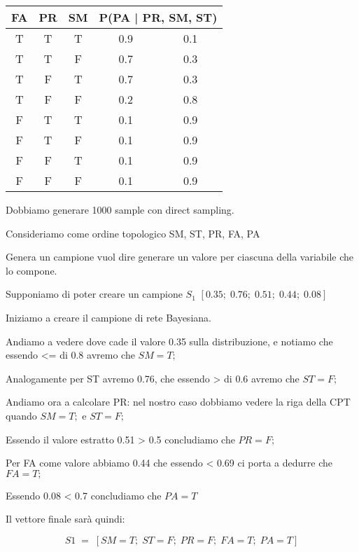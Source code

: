 \documentclass{article}
\begin{document}
\begin{tabular}{|c|c|c|cc|}
	\hline
	FA & PR & SM & \multicolumn{2}{c|}{P(PA | PR, SM, ST)} \\ \hline
	T  & T  & T  & \multicolumn{1}{c|}{0.9}      & 0.1     \\ \hline
	T  & T  & F  & \multicolumn{1}{c|}{0.7}      & 0.3     \\ \hline
	T  & F  & T  & \multicolumn{1}{c|}{0.7}      & 0.3     \\ \hline
	T  & F  & F  & \multicolumn{1}{c|}{0.2}      & 0.8     \\ \hline
	F  & T  & T  & \multicolumn{1}{c|}{0.1}      & 0.9     \\ \hline
	F  & T  & F  & \multicolumn{1}{c|}{0.1}      & 0.9     \\ \hline
	F  & F  & T  & \multicolumn{1}{c|}{0.1}      & 0.9     \\ \hline
	F  & F  & F  & \multicolumn{1}{c|}{0.1}      & 0.9     \\ \hline
\end{tabular}

\vspace{0.3cm}
Dobbiamo generare 1000 sample con direct sampling.

Consideriamo come ordine topologico SM, ST, PR, FA, PA

Genera un campione vuol dire generare un valore per ciascuna della variabile che lo compone.

Supponiamo di poter creare un campione $S_1$ \([0.35; \; 0.76; \; 0.51; \; 0.44; \; 0.08]\)

Iniziamo a creare il campione di rete Bayesiana.

Andiamo a vedere dove cade il valore 0.35 sulla distribuzione, e notiamo che essendo <= di 0.8 avremo che \(SM = T;\)

Analogamente per ST avremo 0.76, che essendo > di 0.6 avremo che \(ST = F;\)

Andiamo ora a calcolare PR: nel nostro caso dobbiamo vedere la riga della CPT quando \(SM = T;\) e  \(ST = F;\)

Essendo il valore estratto 0.51 > 0.5 concludiamo che \(PR = F;\)

Per FA come valore abbiamo 0.44 che essendo < 0.69 ci porta a dedurre che \(FA = T;\)


Essendo 0.08 < 0.7 concludiamo che \(PA = T\)

Il vettore finale sarà quindi:

\[
S1 \; = \; [SM = T; \; ST = F; \; PR = F; \; FA = T; \;  PA = T]
\]
\end{document}
